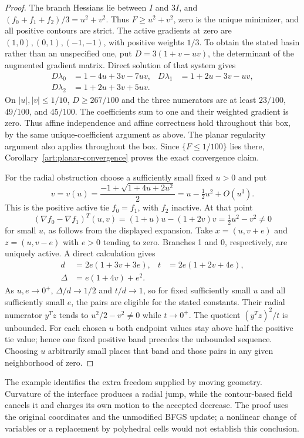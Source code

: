 \begin{proof}
The branch Hessians lie between $I$ and $3I$, and
$(f_0+f_1+f_2)/3=u^2+v^2$. Thus $F\ge u^2+v^2$, zero is the unique
minimizer, and all positive contours are strict. The active gradients at
zero are $(1,0),(0,1),(-1,-1)$, with positive weights $1/3$.
To obtain the stated basin rather than an unspecified one, put
$D=3(1+v-uv)$, the determinant of the augmented gradient matrix.
Direct solution of that system gives
\[
 \begin{aligned}
 D\lambda_0&=1-4u+3v-7uv,&
 D\lambda_1&=1+2u-3v-uv,\\
 D\lambda_2&=1+2u+3v+5uv.&&
 \end{aligned}
\]
On $|u|,|v|\le1/10$, $D\ge267/100$ and the three numerators are at least
$23/100$, $49/100$, and $45/100$. The coefficients sum to one and their
weighted gradient is zero. Thus affine independence and affine correctness
hold throughout this box, by the same unique-coefficient argument as above.
The planar regularity argument also applies throughout the box. Since
$\{F\le1/100\}$ lies there, Corollary~\ref{art:planar-convergence} proves
the exact convergence claim.

For the radial obstruction choose a sufficiently small fixed $u>0$ and put
\[
 v=v(u)=\frac{-1+\sqrt{1+4u+2u^2}}2
       =u-\tfrac12u^2+O(u^3).
\]
This is the positive active tie $f_0=f_1$, with $f_2$ inactive. At that point
\[
 (\nabla f_0-\nabla f_1)^T(u,v)
 =(1+u)u-(1+2v)v=\tfrac12u^2-v^2\ne0
\]
for small $u$, as follows from the displayed expansion. Take
$x=(u,v+e)$ and $z=(u,v-e)$ with $e>0$ tending to zero. Branches 1 and 0,
respectively, are uniquely active. A direct calculation gives
\[
 \begin{aligned}
 d&=2e(1+3v+3e),&t&=2e(1+2v+4e),\\
 \Delta&=e(1+4v)+e^2.&&
 \end{aligned}
\]
As $u,e\to0^+$, $\Delta/d\to1/2$ and $t/d\to1$, so for fixed sufficiently
small $u$ and all sufficiently small $e$, the pairs are eligible for the
stated constants. Their radial numerator $y^Tz$ tends to
$u^2/2-v^2\ne0$ while $t\to0^+$. The quotient $(y^Tz)^2/t$ is unbounded.
For each chosen $u$ both endpoint values stay above half the positive tie
value; hence one fixed positive band precedes the unbounded sequence.
Choosing $u$ arbitrarily small places that band and those pairs in any
given neighborhood of zero.
\end{proof}

The example identifies the extra freedom supplied by moving geometry.
Curvature of the interface produces a radial jump, while the contour-based
field cancels it and charges its own motion to the accepted decrease.
The proof uses the original coordinates and the unmodified BFGS update;
a nonlinear change of variables or a replacement by polyhedral cells would
not establish this conclusion.
